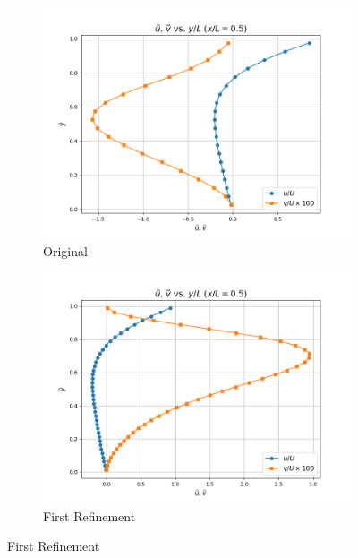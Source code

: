\documentclass[11pt]{article}
\begin{document}
\begin{figure}[H]
   \centering
   \begin{subfigure}{0.495\linewidth}
      \includegraphics[width=\textwidth]{images/Velocity_Component_Plot_for_gridsize_20x20.png}
      \caption{Original}
   \end{subfigure}
   \begin{subfigure}{0.495\linewidth}
      \includegraphics[width=\textwidth]{images/Velocity_Component_Plot_for_gridsize_40x40.png}
      \caption{First Refinement}
   \end{subfigure}
   \vspace{5mm}


\end{figure}
\end{document}
